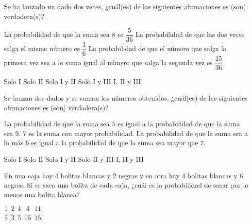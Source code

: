 \documentclass[sin nombre]{srs2}
\begin{document}
\begin{preguntas}
\pregunta Se ha lanzado un dado dos veces, ¿cuál(es) de las siguientes afirmaciones es (son) verdadera(s)?
\begin{opciones}
\opcion La probabilidad de que la suma sea $8$ es $\dfrac{5}{36}$
\opcion La probabilidad de que las dos veces salga el mismo número es $\dfrac{1}{6}$
\opcion La probabilidad de que el número que salga la primera vez sea a lo sumo igual al número que salga la segunda vez es $\dfrac{15}{36}$
\end{opciones}
\begin{alternativas}
\alternativa Solo I
\alternativa Solo II
\alternativa Solo I y II
\alternativa Solo I y III
\alternativa I, II y III
\end{alternativas}

\pregunta Se lanzan dos dados y se suman los números obtenidos, ¿cuál(es) de las siguientes afirmaciones es (son) verdadera(s)?
\begin{opciones}
\opcion La probabilidad de que la suma sea $5$ es igual a la probabilidad de que la suma sea $9$.
\opcion $7$ es la suma con mayor probabilidad.
\opcion La probabilidad de que la suma sea a lo más $6$ es igual a la probabilidad de que la suma sea mayor que $7$.
\end{opciones}
\begin{alternativas}
\alternativa Solo I
\alternativa Solo II
\alternativa Solo I y II
\alternativa Solo II y III
\alternativa I, II y III
\end{alternativas}

\pregunta En una caja hay 4 bolitas blancas y 2 negras y en otra hay 4 bolitas blancas y 6 negras. Si se saca una bolita de cada caja, ¿cuál es la probabilidad de sacar por lo menos una bolita blanca?
\begin{alternativas}
\alternativa $\dfrac{1}{5}$
\alternativa $\dfrac{2}{3}$
\alternativa $\dfrac{4}{5}$
\alternativa $\dfrac{4}{15}$
\alternativa $\dfrac{11}{15}$
\end{alternativas}


\end{preguntas}
\end{document}
